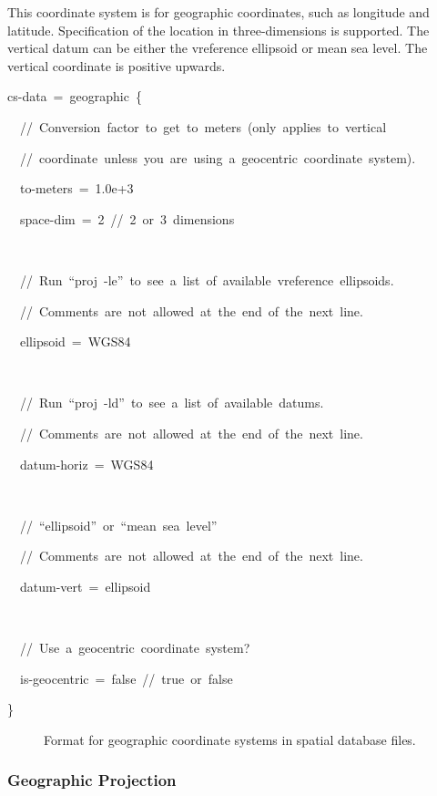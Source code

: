 This coordinate system is for geographic coordinates, such as longitude
and latitude. Specification of the location in three-dimensions is
supported. The vertical datum can be either the vreference ellipsoid
or mean sea level. The vertical coordinate is positive upwards.
\begin{lyxcode}
cs-data~=~geographic~\{

~~//~Conversion~factor~to~get~to~meters~(only~applies~to~vertical~

~~//~coordinate~unless~you~are~using~a~geocentric~coordinate~system).

~~to-meters~=~1.0e+3

~~space-dim~=~2~//~2~or~3~dimensions

~

~~//~Run~``proj~-le''~to~see~a~list~of~available~vreference~ellipsoids.

~~//~Comments~are~not~allowed~at~the~end~of~the~next~line.

~~ellipsoid~=~WGS84

~

~~//~Run~``proj~-ld''~to~see~a~list~of~available~datums.

~~//~Comments~are~not~allowed~at~the~end~of~the~next~line.

~~datum-horiz~=~WGS84

~

~~//~``ellipsoid''~or~``mean~sea~level''

~~//~Comments~are~not~allowed~at~the~end~of~the~next~line.

~~datum-vert~=~ellipsoid

~

~~//~Use~a~geocentric~coordinate~system?

~~is-geocentric~=~false~//~true~or~false

\}
\end{lyxcode}
\begin{figure}[H]
\caption{Format for geographic coordinate systems in spatial database files.}
\end{figure}



\subsubsection{Geographic Projection}


